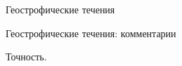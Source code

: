 \begin{chapter}{Геострофические течения}
\begin{section}{Геострофические течения: комментарии}
\begin{paragraph}{Точность.}
\end{paragraph}
\end{section}


\end{chapter}
